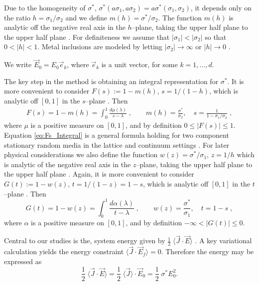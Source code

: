 \documentclass[english,12pt,jmp,graphicx]{revtex4-1}
\begin{document}
Due to the homogeneity of $\sigma^*$, $\sigma^*(a\sigma_1,a\sigma_2)=a\sigma^*(\sigma_1,\sigma_2)$, it
depends only on the ratio $h = \sigma_1/\sigma_2$ and we define
$m(h)=\sigma^*/\sigma_2$. The function $m(h)$ is analytic off the negative real
axis 
in the $h$--plane, taking the upper half plane to the upper half plane
\cite{Golden:CMP-473}. For definiteness we assume that $|\sigma_1|<|\sigma_2|$
so that $0<|h|<1$. Metal inclusions are modeled by letting $|\sigma_2|\to\infty$
or $|h|\to0$ \cite{Wen:SoftMatter-200,Jackson-1999}.    

We write $\vec{E}_0=E_0\vec{e}_k$, where $\vec{e}_k$ is a unit vector,
for some $k=1,\ldots,d$.

The key step in the method is obtaining an integral representation for
$\sigma^*$. It is more convenient to consider $F(s):=1-m(h)$, $s=1/(1-h)$,
which is analytic off $[0,1]$ in the $s$--plane
\cite{Bergman:PRC-377,Golden:CMP-473}.  Then \cite{Golden:CMP-473}
%
\begin{align} \label{eq:Fs_Integral}
	F(s)=1-m(h)
	=\int_0^1 \frac{d\mu(\lambda)}{s-\lambda}\;,
   \qquad m(h)=\frac{\sigma^*}{\sigma_2},
   \quad s = \frac{1}{1-\sigma_1/\sigma_2}\;,   
 \end{align}
%
where $\mu$ is a positive measure on $[0,1]$, and by definition
$0\leq|F(s)|\leq1$. Equation \eqref{eq:Fs_Integral} is a
general formula holding for two component stationary random media in
the lattice and continuum settings \cite{Golden:PRL-3935}. For later
physical considerations we also define the function $w(z)=\sigma^*/\sigma_1$,
$z=1/h$ which is analytic of the negative real axis in the $z$--plane, 
taking the upper half plane to the upper half plane
\cite{Golden:CMP-473}. Again, it is more convenient to consider
$G(t):=1-w(z)$, $t=1/(1-z)=1-s$, which is analytic off $[0,1]$ in the 
$t$--plane \cite{Bergman:PRC-377,Golden:CMP-473,Bergman:AP-78}. Then  
%
\begin{equation}\label{eq:Gt_Integral}
	G(t)=1-w(z) 
	=\int_0^1\frac{d\alpha(\lambda)}{t-\lambda}\;,
        \qquad w(z)=\frac{\sigma^*}{\sigma_1},
   \quad t=1-s\;,
\end{equation}
%
where $\alpha$ is a positive measure on $[0,1]$, and by definition
$-\infty<|G(t)|\leq0$.


Central to our studies is the,
system energy given by $\frac{1}{2}\;\langle\vec{J}\cdot\vec{E}\rangle$
\cite{Jackson-1999}. A key variational calculation \cite{Golden:CMP-473}
yields the energy constraint $\langle\vec{J}\cdot\vec{E}_f\rangle=0$. Therefore
the energy may be expressed as  
%
\begin{equation}                                    \label{eq:Reduced_Energy}
    \frac{1}{2}\;\langle\vec{J}\cdot\vec{E}\rangle
      =\frac{1}{2}\;\langle\vec{J}\rangle\cdot\vec{E}_0
        =  \frac{1}{2}\;\sigma^* E_0^2.
\end{equation}
%
\end{document}
